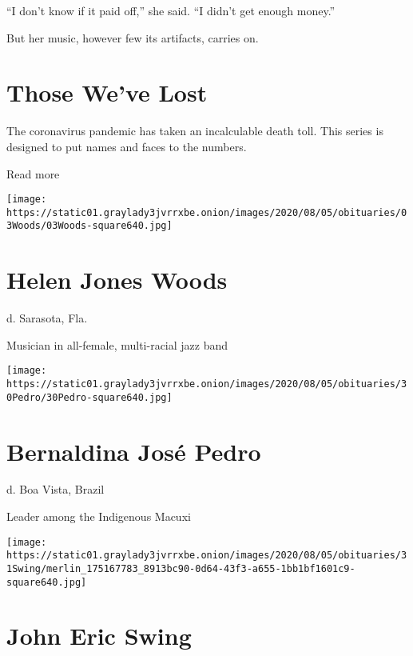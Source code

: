 ``I don't know if it paid off,'' she said. ``I didn't get enough
money.''

But her music, however few its artifacts, carries on.

\href{https://www.nytimes3xbfgragh.onion/interactive/2020/obituaries/people-died-coronavirus-obituaries.html?action=click\&pgtype=Article\&state=default\&region=BELOW_MAIN_CONTENT\&context=covid_obits_promo}{}

\hypertarget{those-weve-lost}{%
\section{Those We've Lost}\label{those-weve-lost}}

The coronavirus pandemic has taken an incalculable death toll. This
series is designed to put names and faces to the numbers.

Read more

\texttt{[image: https://static01.graylady3jvrrxbe.onion/images/2020/08/05/obituaries/03Woods/03Woods-square640.jpg]}

\hypertarget{helen-jones-woods}{%
\section{Helen Jones Woods}\label{helen-jones-woods}}

d. Sarasota, Fla.

Musician in all-female, multi-racial jazz band

\texttt{[image: https://static01.graylady3jvrrxbe.onion/images/2020/08/05/obituaries/30Pedro/30Pedro-square640.jpg]}

\hypertarget{bernaldina-josuxe9-pedro}{%
\section{Bernaldina José Pedro}\label{bernaldina-josuxe9-pedro}}

d. Boa Vista, Brazil

Leader among the Indigenous Macuxi

\texttt{[image: https://static01.graylady3jvrrxbe.onion/images/2020/08/05/obituaries/31Swing/merlin\_175167783\_8913bc90-0d64-43f3-a655-1bb1bf1601c9-square640.jpg]}

\hypertarget{john-eric-swing}{%
\section{John Eric Swing}\label{john-eric-swing}}

